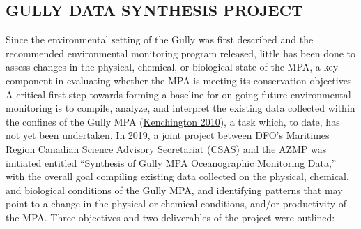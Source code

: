 \documentclass[12pt]{article}\usepackage[]{graphicx}\usepackage[]{color}
\begin{document}
\hypertarget{gully-data-synthesis-project}{%
\subsection{\texorpdfstring{\textbf{GULLY DATA SYNTHESIS PROJECT}}{GULLY DATA SYNTHESIS PROJECT}}\label{gully-data-synthesis-project}}

Since the environmental setting of the Gully was first described and the recommended environmental monitoring program released, little has been done to assess changes in the physical, chemical, or biological state of the MPA, a key component in evaluating whether the MPA is meeting its conservation objectives. A critical first step towards forming a baseline for on-going future environmental monitoring is to compile, analyze, and interpret the existing data collected within the confines of the Gully MPA (\protect\hyperlink{ref-kenchington_2010}{Kenchington 2010}), a task which, to date, has not yet been undertaken. In 2019, a joint project between DFO's Maritimes Region Canadian Science Advisory Secretariat (CSAS) and the AZMP was initiated entitled ``Synthesis of Gully MPA Oceanographic Monitoring Data,'' with the overall goal compiling existing data collected on the physical, chemical, and biological conditions of the Gully MPA, and identifying patterns that may point to a change in the physical or chemical conditions, and/or productivity of the MPA. Three objectives and two deliverables of the project were outlined:
\end{document}
